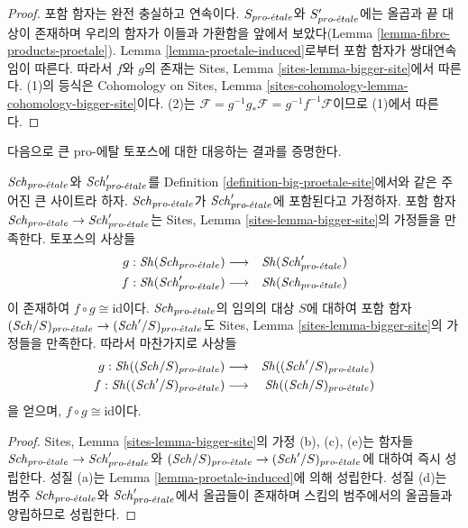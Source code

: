 \begin{proof}
포함 함자는 완전 충실하고 연속이다. $S_{pro\text{-}\acute{e}tale}$와
$S_{pro\text{-}\acute{e}tale}'$에는 올곱과 끝 대상이 존재하며 우리의 함자가 이들과
가환함을 앞에서 보았다(Lemma \ref{lemma-fibre-products-proetale}).
Lemma \ref{lemma-proetale-induced}로부터 포함 함자가 쌍대연속임이
따른다. 따라서 $f$와 $g$의 존재는 Sites, Lemma
\ref{sites-lemma-bigger-site}에서 따른다. (1)의 등식은 Cohomology on
Sites, Lemma \ref{sites-cohomology-lemma-cohomology-bigger-site}이다.
(2)는 $\mathcal{F} = g^{-1}g_*\mathcal{F} =
g^{-1}f^{-1}\mathcal{F}$이므로 (1)에서 따른다.
\end{proof}

\noindent
다음으로 큰 pro-에탈 토포스에 대한 대응하는 결과를 증명한다.

\begin{lemma}
\label{lemma-change-alpha}
$\mathit{Sch}_{pro\text{-}\acute{e}tale}$와 $\mathit{Sch}'_{pro\text{-}\acute{e}tale}$를 Definition
\ref{definition-big-proetale-site}에서와 같은 주어진 큰 사이트라 하자.
$\mathit{Sch}_{pro\text{-}\acute{e}tale}$가 $\mathit{Sch}'_{pro\text{-}\acute{e}tale}$에 포함된다고 가정하자. 포함 함자
$\mathit{Sch}_{pro\text{-}\acute{e}tale} \to \mathit{Sch}'_{pro\text{-}\acute{e}tale}$는 Sites, Lemma
\ref{sites-lemma-bigger-site}의 가정들을 만족한다. 토포스의 사상들
\begin{eqnarray*}
g : \mathop{\mathit{Sh}}\nolimits(\mathit{Sch}_{pro\text{-}\acute{e}tale}) &
\longrightarrow &
\mathop{\mathit{Sh}}\nolimits(\mathit{Sch}'_{pro\text{-}\acute{e}tale}) \\
f : \mathop{\mathit{Sh}}\nolimits(\mathit{Sch}'_{pro\text{-}\acute{e}tale}) &
\longrightarrow &
\mathop{\mathit{Sh}}\nolimits(\mathit{Sch}_{pro\text{-}\acute{e}tale})
\end{eqnarray*}
이 존재하여 $f \circ g \cong \text{id}$이다. $\mathit{Sch}_{pro\text{-}\acute{e}tale}$의 임의의
대상 $S$에 대하여 포함 함자
$(\mathit{Sch}/S)_{pro\text{-}\acute{e}tale} \to (\mathit{Sch}'/S)_{pro\text{-}\acute{e}tale}$도 Sites, Lemma
\ref{sites-lemma-bigger-site}의 가정들을 만족한다. 따라서 마찬가지로
사상들
\begin{eqnarray*}
g : \mathop{\mathit{Sh}}\nolimits((\mathit{Sch}/S)_{pro\text{-}\acute{e}tale}) &
\longrightarrow &
\mathop{\mathit{Sh}}\nolimits((\mathit{Sch}'/S)_{pro\text{-}\acute{e}tale}) \\
f : \mathop{\mathit{Sh}}\nolimits((\mathit{Sch}'/S)_{pro\text{-}\acute{e}tale}) &
\longrightarrow &
\mathop{\mathit{Sh}}\nolimits((\mathit{Sch}/S)_{pro\text{-}\acute{e}tale})
\end{eqnarray*}
을 얻으며, $f \circ g \cong \text{id}$이다.
\end{lemma}

\begin{proof}
Sites, Lemma \ref{sites-lemma-bigger-site}의 가정 (b), (c), (e)는 함자들
$\mathit{Sch}_{pro\text{-}\acute{e}tale} \to \mathit{Sch}'_{pro\text{-}\acute{e}tale}$와
$(\mathit{Sch}/S)_{pro\text{-}\acute{e}tale} \to (\mathit{Sch}'/S)_{pro\text{-}\acute{e}tale}$에 대하여 즉시
성립한다. 성질 (a)는 Lemma \ref{lemma-proetale-induced}에 의해
성립한다. 성질 (d)는 범주 $\mathit{Sch}_{pro\text{-}\acute{e}tale}$와
$\mathit{Sch}'_{pro\text{-}\acute{e}tale}$에서 올곱들이 존재하며 스킴의 범주에서의 올곱들과
양립하므로 성립한다.
\end{proof}

